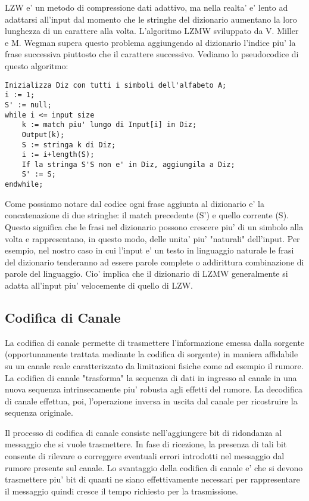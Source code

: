 \documentclass[a4paper,11pt]{article}
\theoremstyle{definition}
\begin{document}
LZW e' un metodo di compressione dati adattivo, ma nella realta' e' lento ad adattarsi all'input dal momento che le stringhe del dizionario aumentano la loro lunghezza di un carattere alla volta. L'algoritmo LZMW sviluppato da V. Miller e M. Wegman \cite{lzmw} supera questo problema aggiungendo al dizionario l'indice piu' la frase successiva piuttosto che il carattere successivo. 
Vediamo lo pseudocodice di questo algoritmo:
\begin{verbatim}
Inizializza Diz con tutti i simboli dell'alfabeto A;
i := 1;
S' := null;
while i <= input size
    k := match piu' lungo di Input[i] in Diz;
    Output(k);
    S := stringa k di Diz;
    i := i+length(S);
    If la stringa S'S non e' in Diz, aggiungila a Diz;
    S' := S;
endwhile;
\end{verbatim}
Come possiamo notare dal codice ogni frase aggiunta al dizionario e' la concatenazione di due stringhe: il match precedente (S') e quello corrente (S).
Questo significa che le frasi nel dizionario possono crescere piu' di un simbolo alla volta e rappresentano, in questo modo, delle unita' piu' "naturali" dell'input.
Per esempio, nel nostro caso in cui l'input e' un testo in linguaggio naturale le frasi del dizionario tenderanno ad essere parole complete o addirittura combinazione di parole del linguaggio. Cio' implica che il dizionario di LZMW generalmente si adatta all'input piu' velocemente di quello di LZW.


\subsection{Codifica di Canale}
La codifica di canale permette di trasmettere l'informazione emessa dalla sorgente (opportunamente trattata mediante la codifica di sorgente) in maniera affidabile su un canale reale caratterizzato da limitazioni fisiche come ad esempio il rumore. La codifica di canale "trasforma" la sequenza di dati in
ingresso al canale in una nuova sequenza intrinsecamente piu' robusta agli effetti del rumore. La decodifica di canale effettua, poi, l'operazione inversa in
uscita dal canale per ricostruire la sequenza originale. 

Il processo di codifica di canale consiste nell'aggiungere bit di ridondanza al messaggio che si vuole trasmettere. In fase di ricezione, la presenza di tali bit consente di rilevare o correggere eventuali errori introdotti nel messaggio dal rumore presente sul canale. Lo svantaggio della codifica di canale e' che si devono trasmettere piu' bit di quanti ne siano effettivamente necessari per rappresentare il messaggio quindi cresce il tempo richiesto per la trasmissione.
\end{document}
